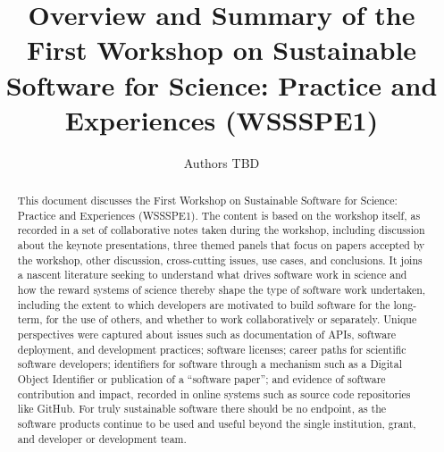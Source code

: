 \documentclass[11pt, oneside]{amsart}
\begin{document}
\title[]{Overview and Summary of the First Workshop on Sustainable Software for Science: Practice and Experiences (WSSSPE1)}

\author{Authors TBD}

%
%
%
%
%

\begin{abstract}
This document discusses the First Workshop on Sustainable
Software for Science: Practice and Experiences (WSSSPE1).  The content
is based on the workshop itself, as recorded in a set of
collaborative notes taken during the workshop, including discussion
about the keynote presentations, three themed panels that focus on
papers accepted by the workshop, other discussion, cross-cutting
issues, use cases, and conclusions.  It joins a nascent literature
seeking to understand what drives software work in science and how the
reward systems of science thereby shape the type of software work
undertaken, including the extent to which developers are motivated to
build software for the long-term, for the use of others, and whether
to work collaboratively or separately. Unique perspectives were
captured about issues such as documentation of APIs, software
deployment, and development practices; software licenses; career
paths for scientific software developers; identifiers for software
through a mechanism such as a Digital Object Identifier or
publication of a ``software paper''; and evidence of software
contribution and impact, recorded in online systems such as source
code repositories like GitHub. For truly sustainable software there
should be no endpoint, as the software products continue to be used
and useful beyond the single institution, grant, and developer or
development team.

\end{abstract}


\maketitle
\end{document}
